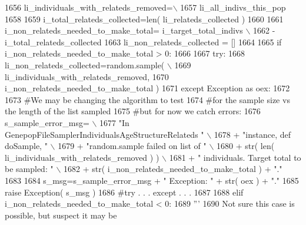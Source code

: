\begin{DoxyCode}
1656                 li\_individuals\_with\_relateds\_removed=\(\backslash\)
1657                                     li\_all\_indivs\_this\_pop
1658 
1659                 i\_total\_relateds\_collected=len( li\_relateds\_collected )
1660 
1661                 i\_non\_relateds\_needed\_to\_make\_total= i\_target\_total\_indivs \(\backslash\)
1662                                                     - i\_total\_relateds\_collected
1663                 li\_non\_relateds\_collected = []
1664 
1665                 \textcolor{keywordflow}{if} i\_non\_relateds\_needed\_to\_make\_total > 0:
1666 
1667                     \textcolor{keywordflow}{try}:
1668                         li\_non\_relateds\_collected=random.sample( \(\backslash\)
1669                                             li\_individuals\_with\_relateds\_removed, 
1670                                                 i\_non\_relateds\_needed\_to\_make\_total )
1671                     \textcolor{keywordflow}{except} Exception \textcolor{keyword}{as} oex:
1672 
1673                         \textcolor{comment}{#We may be changing the algorithm to test}
1674                         \textcolor{comment}{#for the sample size vs the length of the list sampled}
1675                         \textcolor{comment}{#but for now we catch errors:}
1676                         s\_sample\_error\_msg= \(\backslash\)
1677                                 \textcolor{stringliteral}{"In GenepopFileSamplerIndividualsAgeStructureRelateds "} \(\backslash\)
1678                                 + \textcolor{stringliteral}{"instance, def doSample, "}  \(\backslash\)
1679                                 + \textcolor{stringliteral}{"random.sample failed on list of "} \(\backslash\)
1680                                 + str( len( li\_individuals\_with\_relateds\_removed ) ) \(\backslash\)
1681                                 + \textcolor{stringliteral}{" individuals.  Target total to be sampled: "} \(\backslash\)
1682                                 + str( i\_non\_relateds\_needed\_to\_make\_total ) + \textcolor{stringliteral}{"."}
1683 
1684                         s\_msg=s\_sample\_error\_msg + \textcolor{stringliteral}{"  Exception: "} + str( oex ) + \textcolor{stringliteral}{"."}
1685                         \textcolor{keywordflow}{raise} Exception( s\_msg )
1686                     \textcolor{comment}{#try . . . except . . . }
1687 
1688                 \textcolor{keywordflow}{elif} i\_non\_relateds\_needed\_to\_make\_total < 0:
1689                     \textcolor{stringliteral}{'''}
1690 \textcolor{stringliteral}{                    Not sure this case is possible, but suspect it may be}

\end{DoxyCode}
